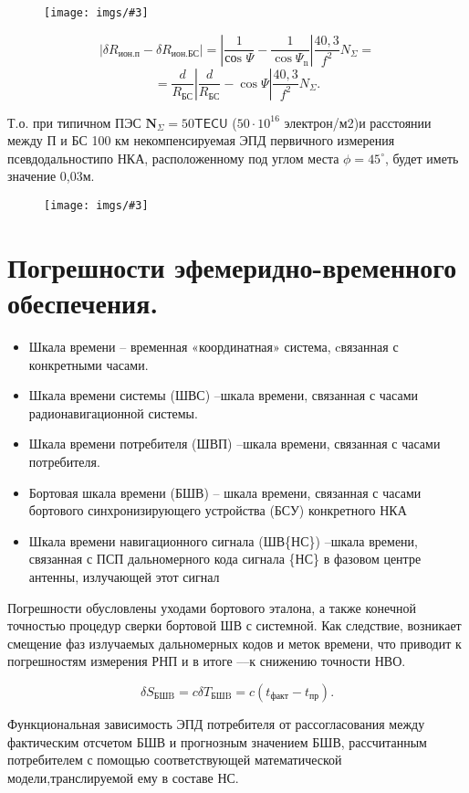 \documentclass[14pt,a4paper,oneside]{extarticle}
\newcommand{\pic}[3]{
	\begin{figure}[#1]
		\begin{center}
			\texttt{[image: imgs/\#3]}
		\end{center}
	\end{figure}
}
\begin{document}
\pic{H}{\textwidth}{4}

\[\left|\delta R_{\text{ион.п}}-\delta R_{\text{ион.БС}}\right|=\left|\frac{1}{\text{соs }\Psi}-\frac{1}{\cos\Psi_{\text{n}}}\right|\frac{40,3}{f^{2}}N_{\Sigma}=\]
\[=\frac{d}{R_{\text{БС}}}\left|\frac{d}{R_{\text{БС}}}-\cos\Psi\right|\frac{40,3}{f^{2}}N_{\Sigma}.\]

Т.о. при типичном ПЭС $\mathbf{N}_{\Sigma}=50\mathsf{ TECU}$ ($50\cdot10^{16}$ электрон/м2)и расстоянии между П и БС 100 км некомпенсируемая ЭПД первичного измерения псевдодальностипо НКА, расположенному под углом места $\phi=45^{\circ}$, будет иметь значение 0,03м.

\pic{H}{\textwidth}{5}

\section{Погрешности эфемеридно-временного обеспечения.}

\begin{itemize}
    \item Шкала времени – временная «координатная» система, cвязанная с конкретными часами.
    \item Шкала времени системы (ШВС) –шкала времени, связанная с часами радионавигационной системы.
    \item Шкала времени потребителя (ШВП) –шкала времени,  связанная с часами потребителя.
    \item Бортовая шкала времени (БШВ)  – шкала времени, связанная с часами бортового синхронизирующего устройства (БСУ) конкретного НКА
    \item Шкала времени навигационного сигнала (ШВ\{НС\}) –шкала времени, связанная с ПСП дальномерного кода сигнала \{НС\} в фазовом центре антенны, излучающей этот сигнал
\end{itemize}

Погрешности обусловлены уходами бортового эталона, а также конечной точностью процедур сверки бортовой ШВ с системной. Как следствие, возникает смещение фаз излучаемых дальномерных кодов и меток времени, что приводит к погрешностям измерения РНП и в итоге ––к снижению точности НВО.

\[\delta S_{\text{БШB}}=c\delta T_{\text{БШB}}=c\left(t_\text{факт}-t_\text{{пр}}\right).\]

Функциональная зависимость ЭПД потребителя от рассогласования между фактическим отсчетом БШВ и прогнозным значением БШВ, рассчитанным потребителем с помощью соответствующей математической модели,транслируемой ему в составе НС.
\end{document}
